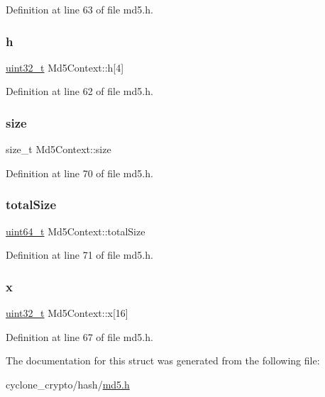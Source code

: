Definition at line 63 of file md5.\+h.

\mbox{\label{structMd5Context_afcd35f42c47833b4acef6ebabf9a2bcd}} 
\subsubsection{\texorpdfstring{h}{h}}
{\footnotesize\ttfamily \hyperlink{stdint_8h_a435d1572bf3f880d55459d9805097f62}{uint32\+\_\+t} Md5\+Context\+::h\mbox{[}4\mbox{]}}



Definition at line 62 of file md5.\+h.

\mbox{\label{structMd5Context_aa802ea44a60442aac9d00dbbb239d41e}} 
\subsubsection{\texorpdfstring{size}{size}}
{\footnotesize\ttfamily size\+\_\+t Md5\+Context\+::size}



Definition at line 70 of file md5.\+h.

\mbox{\label{structMd5Context_a32a910e80c0df0da1312dd192054c390}} 
\subsubsection{\texorpdfstring{total\+Size}{totalSize}}
{\footnotesize\ttfamily \hyperlink{stdint_8h_aec6fcb673ff035718c238c8c9d544c47}{uint64\+\_\+t} Md5\+Context\+::total\+Size}



Definition at line 71 of file md5.\+h.

\mbox{\label{structMd5Context_addf9a6d04005abcf8946f5552462344c}} 
\subsubsection{\texorpdfstring{x}{x}}
{\footnotesize\ttfamily \hyperlink{stdint_8h_a435d1572bf3f880d55459d9805097f62}{uint32\+\_\+t} Md5\+Context\+::x\mbox{[}16\mbox{]}}



Definition at line 67 of file md5.\+h.



The documentation for this struct was generated from the following file\+:\begin{DoxyCompactItemize}
\item 
cyclone\+\_\+crypto/hash/\hyperlink{md5_8h}{md5.\+h}\end{DoxyCompactItemize}
